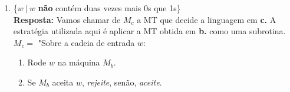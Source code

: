 \begin{enumerate}[label={\textbf{\alph*.}}]
\begin{enumerate}[label={\textbf{\arabic*.}}, leftmargin=1in]
\begin{comment}
\item Faça uma varredura na fita da esquerda para a direita e marque o primeiro 0 que ainda não esteja marcado. Mova a cabeça para a direita até encontrar o segundo 0 que não esteja marcado e marque-o. Se nenhum ou apenas um 0 desmarcado foi encontrado, \textit{rejeite}. Retorne a cabeça para a extremidade esquerda da fita.
\item Faça uma varredura na fita da esquerda para a direita e marque o primeiro 1 que ainda não esteja marcado. Se a varredura não encontrou nenhum 1 desmarcado, \textit{rejeite}. Retorne a cabeça para a extremidade esquerda da fita.
\item Faça uma nova varredura na fita da esquerda para a direita. Se pelo menos dois 0s desmarcados foram encontrados, retorne ao passo 1, caso contrário, passe ao passo 4. Antes de mover-se para o passo decidido, mova a cabeça para a extremidade esquerda da fita.
\item Novamente, faça uma varredura na fita da esquerda para a direita. Se houver um 1 desmarcado, \textit{rejeite}, senão \textit{aceite}.
\end{comment}

\end{enumerate}

\item \{$w\ |\ w$ \textbf{não} contém duas vezes mais 0s que 1s\}\\[3pt]
\textbf{Resposta: } Vamos chamar de $M_c$ a MT que decide a linguagem em \textbf{c.} A estratégia utilizada aqui é aplicar a MT obtida em \textbf{b.} como uma subrotina.\\[3pt]
$M_c = $ "Sobre a cadeia de entrada $w$:
\begin{enumerate}[label={\textbf{\arabic*.}}, leftmargin=1in]
\item Rode $w$ na máquina $M_b$.
\item Se $M_b$ aceita $w$, \textit{rejeite}, senão, \textit{aceite}.
\end{enumerate}

\end{enumerate}